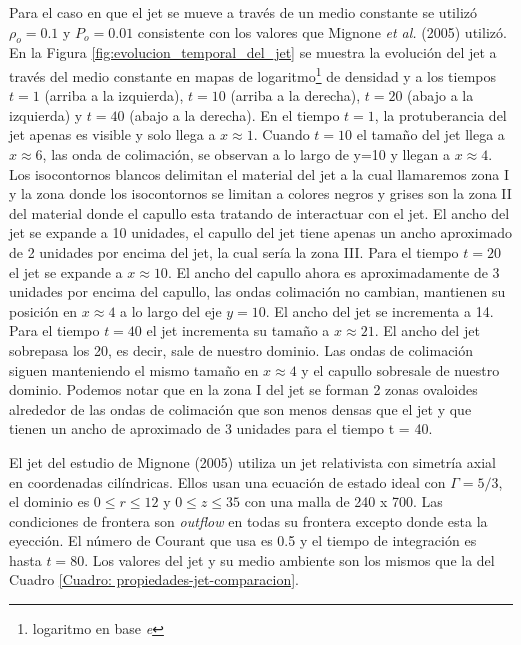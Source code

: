 \documentclass[12pt,a4paper]{book}
\begin{document}
Para el caso en que el jet se mueve a través de un medio constante se utilizó 
$\rho_o = 0.1 $ y $P_o = 0.01$ {\color {red} consistente con los valores que Mignone \emph{et al.} (2005) utilizó}. 
En la Figura \ref{fig:evolucion_temporal_del_jet} se muestra la evolución del jet a 
través del medio constante en mapas de {\color {red} logaritmo\footnote{logaritmo en base \emph{e}} de densidad} y 
{\color {red} a los tiempos $t = 1$ (arriba a la izquierda), $t = 10$ (arriba a la derecha), 
$t = 20$ (abajo a la izquierda) y $t = 40$ (abajo a la derecha).
En el tiempo $t = 1$, la protuberancia del jet apenas es visible y solo llega a $x \approx 1$. 
{\color{blue} Cuando $t = 10$ el tamaño del jet llega a $x \approx 6$, las onda de colimación, se observan a 
lo largo de y=10 y llegan a $x \approx 4$. Los isocontornos blancos delimitan el material del jet a la
cual llamaremos zona I y la zona donde los isocontornos se limitan a colores negros y grises son
la zona II del material donde el capullo esta tratando de interactuar con el jet}. El ancho del jet se expande a 10 unidades, el capullo del jet tiene
apenas un ancho aproximado de 2 unidades por encima del jet, {\color{blue} la cual sería la zona III}. 
Para el tiempo $t = 20$ el jet se expande a 
$x \approx 10$. El ancho del capullo ahora es aproximadamente de 
3 unidades por encima del capullo, las ondas colimación no cambian, mantienen su posición en $x \approx 4$ a lo largo del eje $y = 10$. 
El ancho del jet se incrementa a 14. Para el tiempo $t = 40$ el jet incrementa su tamaño a $x \approx 21$. 
El ancho del jet sobrepasa los 20, es decir, sale de nuestro dominio. Las ondas de colimación siguen manteniendo el mismo 
tamaño en $x \approx 4$ y el capullo sobresale de nuestro dominio. {\color{blue} Podemos notar que en la zona I del jet 
se forman 2 zonas ovaloides alrededor de las ondas de colimación que son menos densas que el jet y que tienen un 
ancho de aproximado de 3 unidades para el tiempo t = 40.}
}


El jet del estudio de Mignone (2005) utiliza un jet relativista con simetría axial en 
coordenadas cilíndricas. Ellos usan una ecuación de estado ideal con $\Gamma = 5/3$, el dominio es 
$0 \leqslant r \leqslant 12$ y $0 \leqslant z \leqslant 35$ con una malla de 240 x 700. Las condiciones de
frontera son \emph{outflow} en todas su frontera excepto donde esta la eyección. El número de Courant que
usa es 0.5 y el tiempo de integración es hasta $t = 80$. Los valores del jet y su medio ambiente son los
mismos que la del Cuadro \ref{Cuadro: propiedades-jet-comparacion}.
\end{document}
